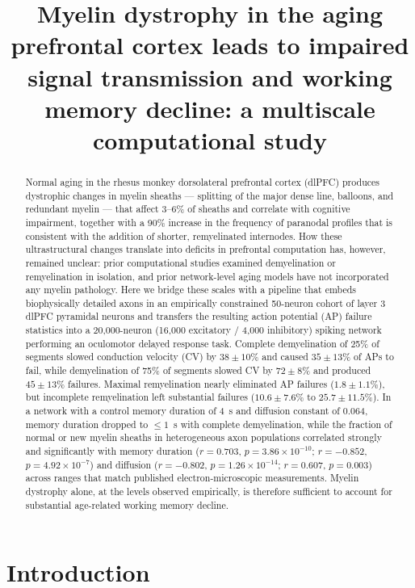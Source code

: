 \documentclass[11pt]{article}
\title{Myelin dystrophy in the aging prefrontal cortex leads to impaired signal transmission and working memory decline: a multiscale computational study}
\author{}
\date{}
\begin{document}
\maketitle

\begin{abstract}
Normal aging in the rhesus monkey dorsolateral prefrontal cortex (dlPFC) produces dystrophic changes in myelin sheaths --- splitting of the major dense line, balloons, and redundant myelin --- that affect 3--6\% of sheaths and correlate with cognitive impairment, together with a 90\% increase in the frequency of paranodal profiles that is consistent with the addition of shorter, remyelinated internodes. How these ultrastructural changes translate into deficits in prefrontal computation has, however, remained unclear: prior computational studies examined demyelination or remyelination in isolation, and prior network-level aging models have not incorporated any myelin pathology. Here we bridge these scales with a pipeline that embeds biophysically detailed axons in an empirically constrained 50-neuron cohort of layer 3 dlPFC pyramidal neurons and transfers the resulting action potential (AP) failure statistics into a 20{,}000-neuron (16{,}000 excitatory / 4{,}000 inhibitory) spiking network performing an oculomotor delayed response task. Complete demyelination of 25\% of segments slowed conduction velocity (CV) by $38 \pm 10\%$ and caused $35 \pm 13\%$ of APs to fail, while demyelination of 75\% of segments slowed CV by $72 \pm 8\%$ and produced $45 \pm 13\%$ failures. Maximal remyelination nearly eliminated AP failures ($1.8 \pm 1.1\%$), but incomplete remyelination left substantial failures ($10.6 \pm 7.6\%$ to $25.7 \pm 11.5\%$). In a network with a control memory duration of 4~s and diffusion constant of 0.064, memory duration dropped to $\leq 1$~s with complete demyelination, while the fraction of normal or new myelin sheaths in heterogeneous axon populations correlated strongly and significantly with memory duration ($r=0.703$, $p=3.86\times10^{-10}$; $r=-0.852$, $p=4.92\times10^{-7}$) and diffusion ($r=-0.802$, $p=1.26\times10^{-14}$; $r=0.607$, $p=0.003$) across ranges that match published electron-microscopic measurements. Myelin dystrophy alone, at the levels observed empirically, is therefore sufficient to account for substantial age-related working memory decline.
\end{abstract}

\section{Introduction}
\end{document}
